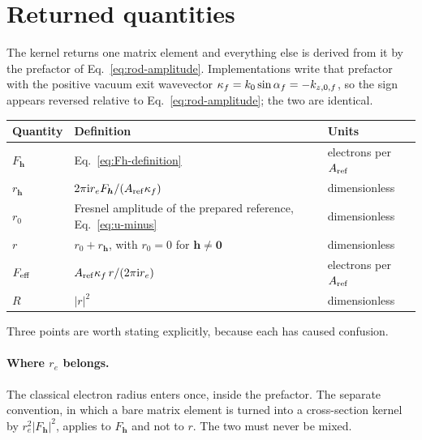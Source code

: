 \section{Returned quantities}

The kernel returns one matrix element and everything else is derived from it
by the prefactor of Eq.~\eqref{eq:rod-amplitude}.  Implementations write that
prefactor with the positive vacuum exit wavevector
$\kappa_f=k_0\sin\alpha_f=-k_{z,0,f}$, so the sign appears reversed relative
to Eq.~\eqref{eq:rod-amplitude}; the two are identical.

\begin{center}
\begin{tabular}{@{}lll@{}}
\toprule
Quantity & Definition & Units \\
\midrule
$F_{\bm h}$
  & Eq.~\eqref{eq:Fh-definition}
  & electrons per $A_{\rm ref}$ \\
$r_{\bm h}$
  & $2\pi\mathrm{i} r_e F_{\bm h}/(A_{\rm ref}\kappa_f)$
  & dimensionless \\
$r_0$
  & Fresnel amplitude of the prepared reference, Eq.~\eqref{eq:u-minus}
  & dimensionless \\
$r$
  & $r_0+r_{\bm h}$, with $r_0=0$ for $\bm h\neq\bm 0$
  & dimensionless \\
$F_{\rm eff}$
  & $A_{\rm ref}\kappa_f\,r/(2\pi\mathrm{i} r_e)$
  & electrons per $A_{\rm ref}$ \\
$R$
  & $|r|^2$
  & dimensionless \\
\bottomrule
\end{tabular}
\end{center}

Three points are worth stating explicitly, because each has caused confusion.

\paragraph{Where $r_e$ belongs.}  The classical electron radius enters once,
inside the prefactor.  The separate convention, in which a bare matrix element
is turned into a cross-section kernel by $r_e^2|F_{\bm h}|^2$, applies to
$F_{\bm h}$ and not to $r$.  The two must never be mixed.

